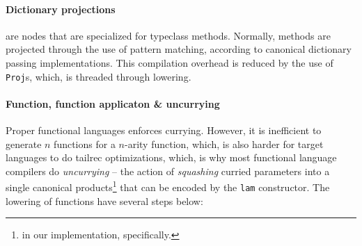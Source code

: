 \documentclass[a4paper, 11pt]{article}
\theoremstyle{remark}\newtheorem*{remark}{Remark}
\theoremstyle{definition}\newtheorem*{definition}{Definition}
\begin{document}
\paragraph{Dictionary projections} are nodes that are specialized for typeclass methods. Normally,
methods are projected through the use of pattern matching, according to canonical dictionary passing
implementations. This compilation overhead is reduced by the use of \texttt{Proj}s, which, is threaded
through \Lambdair lowering.

\paragraph{Function, function applicaton \& uncurrying}\label{sbcl:cav} Proper functional languages enforces currying. However, it is
inefficient to generate $n$ functions for a $n$-arity function, which, is also harder for target languages to do tailrec optimizations, which, is why most functional language
compilers do \textit{uncurrying} -- the action of \textit{squashing} curried parameters into a single canonical
products\footnote{in our implementation, specifically.}
that can be encoded by the \texttt{lam} constructor. The lowering of functions have several steps below:
\end{document}
